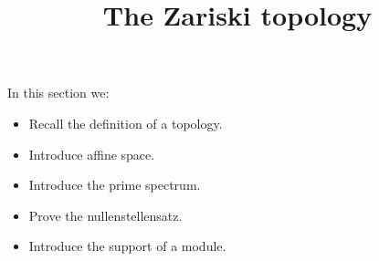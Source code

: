 \documentclass{ximera}
\title{The Zariski topology}
\begin{document}
\begin{abstract}
\end{abstract}

\maketitle

In this section we:

\begin{itemize}
\item Recall the definition of a topology.
\item Introduce affine space.
\item Introduce the prime spectrum.
\item Prove the nullenstellensatz.
\item Introduce the support of a module.
\end{itemize}
\end{document}
